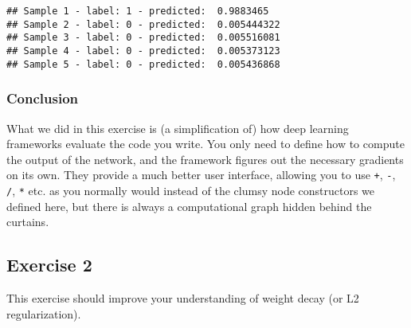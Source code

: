 \documentclass[
  a4paper,
]{article}
\begin{document}
\begin{verbatim}
## Sample 1 - label: 1 - predicted:  0.9883465 
## Sample 2 - label: 0 - predicted:  0.005444322 
## Sample 3 - label: 0 - predicted:  0.005516081 
## Sample 4 - label: 0 - predicted:  0.005373123 
## Sample 5 - label: 0 - predicted:  0.005436868
\end{verbatim}

\hypertarget{conclusion}{%
\subsubsection{Conclusion}\label{conclusion}}

What we did in this exercise is (a simplification of) how deep learning
frameworks evaluate the code you write. You only need to define how to
compute the output of the network, and the framework figures out the
necessary gradients on its own. They provide a much better user
interface, allowing you to use \texttt{+}, \texttt{-}, \texttt{/},
\texttt{*} etc. as you normally would instead of the clumsy node
constructors we defined here, but there is always a computational graph
hidden behind the curtains.

\hypertarget{exercise-2}{%
\subsection{Exercise 2}\label{exercise-2}}

This exercise should improve your understanding of weight decay (or L2
regularization).
\end{document}
